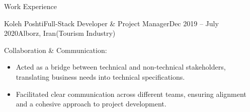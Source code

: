 \documentclass[]{kyvernitis-resume}
\begin{document}
\begin{section}{Work Experience}
\begin{subsection}{Koleh Poshti}{Full-Stack Developer \& Project Manager}{Dec 2019 -- July 2020}{Alborz, Iran}{(Tourism Industry)}
        	\item Collaboration \& Communication:
	\begin{itemize}
	\item Acted as a bridge between technical and non-technical stakeholders, translating business needs into technical specifications.
	\item Facilitated clear communication across different teams, ensuring alignment and a cohesive approach to project development.
	\end{itemize}


    \end{subsection}

\hfill


\end{section}
\end{document}
